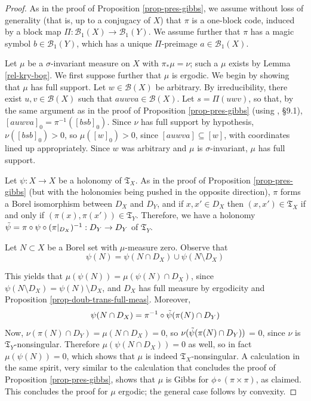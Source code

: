 \documentclass{amsproc}
\numberwithin{theorem}{section}
\theoremstyle{remark}
\theoremstyle{definition}
\newcommand{\cB}{\mathcal{B}}
\newcommand{\fT}{\mathfrak{T}}
\theoremstyle{plain}
\begin{document}
\begin{proof}
As in the proof of Proposition \ref{prop-pres-gibbs}, we assume without loss of generality (that is, up to a conjugacy of $X$) that $\pi$ is a one-block code, induced by a block map $\Pi: \cB_1(X) \to \cB_1(Y)$. We assume further that $\pi$ has a magic symbol $b \in \cB_1(Y)$, which has a unique $\Pi$-preimage $a \in \cB_1(X)$.

Let $\mu$ be a $\sigma$-invariant measure on $X$ with $\pi_* \mu = \nu$; such a $\mu$ exists by Lemma \ref{rel-kry-bog}. We first suppose further that $\mu$ is ergodic. We begin by showing that $\mu$ has full support. Let $w \in \cB(X)$ be arbitrary. By irreducibility, there exist $u,v \in \cB(X)$ such that $auwva \in \cB(X)$. Let $s = \Pi(uwv)$, so that, by the same argument as in the proof of Proposition \ref{prop-pres-gibbs} (using \cite{lind1995introduction}, \S 9.1), $[auwva]_0 = \pi^{-1}([bsb]_0)$. Since $\nu$ has full support by hypothesis, $\nu([bsb]_0) > 0$, so $\mu([w]_0) > 0$, since $[auwva] \subseteq [w]$, with coordinates lined up appropriately. Since $w$ was arbitrary and $\mu$ is $\sigma$-invariant, $\mu$ has full support.


Let $\psi\colon X \to X$ be a holonomy of $\fT_X$. As in the proof of Proposition \ref{prop-pres-gibbs} (but with the holonomies being pushed in the opposite direction), $\pi$ forms a Borel isomorphism between $D_X$ and $D_Y$, and if $x,x' \in D_X$ then $(x,x') \in \fT_X$ if and only if $(\pi(x),\pi(x')) \in \fT_Y$. Therefore, we have a holonomy $\Tilde{\psi} = \pi \circ \psi \circ (\pi|_{D_X})^{-1} : D_Y \to D_Y$ of $\fT_Y$.

Let $N \subset X$ be a Borel set with $\mu$-measure zero. Observe that 
\[
\psi(N) = \psi(N \cap D_X) \cup \psi(N \setminus D_X) %
\]

This yields that $\mu(\psi(N)) = \mu(\psi(N) \cap D_X)$, since $\psi(N \setminus D_X) = \psi(N)\setminus D_X$, and $D_X$ has full measure by ergodicity and Proposition \ref{prop-doub-trans-full-meas}. Moreover, 
\[
\psi(N \cap D_X) = \pi^{-1} \circ \Tilde{\psi} ( \pi(N) \cap D_Y )
\]
Now, $\nu(\pi(N) \cap D_Y) = \mu(N \cap D_X) = 0$, so $\nu(\Tilde{\psi} ( \pi(N) \cap D_Y ))$ = 0, since $\nu$ is $\fT_Y$-nonsingular. Therefore $\mu(\psi(N \cap D_X)) = 0$ as well, so in fact $\mu(\psi(N)) = 0$, which shows that $\mu$ is indeed 
$\fT_X$-nonsingular. A calculation in the same spirit, very similar to the calculation that concludes the proof of Proposition \ref{prop-pres-gibbs}, shows that $\mu$ is Gibbs for $\phi \circ (\pi \times \pi)$, as claimed. This concludes the proof for $\mu$ ergodic; the general case follows by convexity.
\end{proof}
\end{document}
